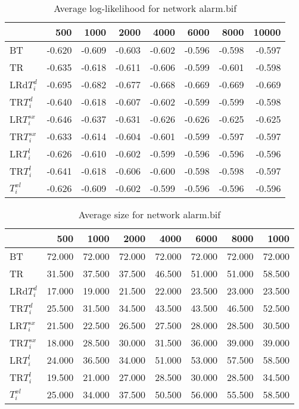 
\begin{table}
 \begin{center}
 \begin{tabular}{lrrrrrrr}
& 500 &  1000 & 2000 & 4000 & 6000& 8000&  10000\\\hline
BT & -0.620 & -0.609 & -0.603 & -0.602 & -0.596 & -0.598 & -0.597\\\hline
TR & -0.635 & -0.618 & -0.611 & -0.606 & -0.599 & -0.601 & -0.598\\\hline
LRd$T_i^d$ & -0.695 & -0.682 & -0.677 & -0.668 & -0.669 & -0.669 & -0.669\\\hline
TR$T_i^d$ & -0.640 & -0.618 & -0.607 & -0.602 & -0.599 & -0.599 & -0.598\\\hline
LR$T_i^{sx}$ & -0.646 & -0.637 & -0.631 & -0.626 & -0.626 & -0.625 & -0.625\\\hline
TR$T_i^{sx}$ & -0.633 & -0.614 & -0.604 & -0.601 & -0.599 & -0.597 & -0.597\\\hline
LR$T_i^l$ & -0.626 & -0.610 & -0.602 & -0.599 & -0.596 & -0.596 & -0.596\\\hline
TR$T_i^l$ & -0.641 & -0.618 & -0.606 & -0.600 & -0.598 & -0.598 & -0.597\\\hline
$T_i^{xl}$ & -0.626 & -0.609 & -0.602 & -0.599 & -0.596 & -0.596 & -0.596\\\hline
\end{tabular}
\end{center}
\caption{Average log-likelihood for network alarm.bif }
\label{alarm.bifll}\end{table}


\begin{table}
\begin{center}
\begin{tabular}{lrrrrrrr}
 & 500 &  1000 & 2000 & 4000 & 6000& 8000&  1000\\\hline
BT & 72.000 & 72.000 & 72.000 & 72.000 & 72.000 & 72.000 & 72.000\\\hline
TR & 31.500 & 37.500 & 37.500 & 46.500 & 51.000 & 51.000 & 58.500\\\hline
LRd$T_i^d$ & 17.000 & 19.000 & 21.500 & 22.000 & 23.500 & 23.000 & 23.500\\\hline
TR$T_i^d$ & 25.500 & 31.500 & 34.500 & 43.500 & 43.500 & 46.500 & 52.500\\\hline
LR$T_i^{sx}$ & 21.500 & 22.500 & 26.500 & 27.500 & 28.000 & 28.500 & 30.500\\\hline
TR$T_i^{sx}$ & 18.000 & 28.500 & 30.000 & 31.500 & 36.000 & 39.000 & 39.000\\\hline
LR$T_i^l$ & 24.000 & 36.500 & 34.000 & 51.000 & 53.000 & 57.500 & 58.500\\\hline
TR$T_i^l$ & 19.500 & 21.000 & 27.000 & 28.500 & 30.000 & 28.500 & 34.500\\\hline
$T_i^{xl}$ & 25.000 & 34.000 & 37.500 & 50.500 & 56.000 & 55.500 & 58.500\\\hline
\end{tabular}
\end{center}
\caption{Average size for network alarm.bif }
\label{alarm.bifsi}\end{table}

